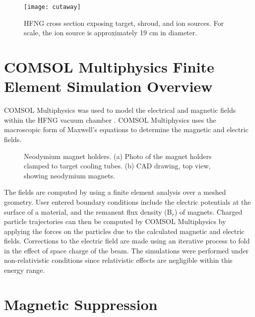 \documentclass[aps,prstab,twocolumn,superscriptaddress]{revtex4-1}
\begin{document}
\begin{figure}
	\centering
	\texttt{[image: cutaway]}
	\caption{HFNG cross section exposing target, shroud, and ion sources. For scale, the ion source is approximately 19 cm in diameter.}
	\label{fig:hfng_cs}
\end{figure} 

\section{COMSOL Multiphysics\textsuperscript{\textregistered} Finite Element Simulation Overview}

COMSOL Multiphysics\textsuperscript{\textregistered} was used to model the electrical and magnetic fields within the HFNG vacuum chamber \cite{Comsol}. COMSOL Multiphysics\textsuperscript{\textregistered} uses the macroscopic form of Maxwell's equations to determine the magnetic and electric fields.

\begin{figure}
	\centering
	\hspace*{\fill}
	\hfill
	\hspace*{\fill}
	\caption{Neodymium magnet holders. (a) Photo of the magnet holders clamped to target cooling tubes. (b) CAD drawing, top view, showing neodymium magnets.}
	\label{fig:target_magnets}
\end{figure}

\noindent The fields are computed by using a finite element analysis over a meshed geometry. User entered boundary conditions include the electric potentials at the surface of a material, and the remanent flux density (B$_{r}$) of magnets. Charged particle trajectories can then be computed by COMSOL Multiphysics\textsuperscript{\textregistered} by applying the forces on the particles due to the calculated magnetic and electric fields. Corrections to the electric field are made using an iterative process to fold in the effect of space charge of the beam. The simulations were performed under non-relativistic conditions since relativistic effects are negligible within this energy range.

\section{Magnetic Suppression}
\end{document}
